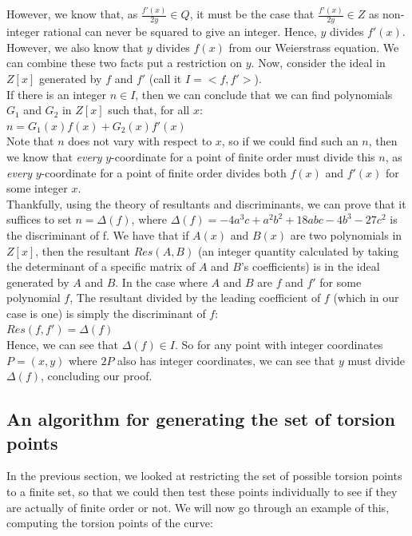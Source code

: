 \documentclass{article}
\begin{document}
However, we know that, as $\frac{f'(x)}{2y} \in Q$, it must be the case that $\frac{f'(x)}{2y} \in Z$ as non-integer rational can never be squared to give an integer. Hence, $y$ divides $f'(x)$. However, we also know that $y$ divides $f(x)$ from our Weierstrass equation. We can combine these two facts put a restriction on $y$. Now, consider the ideal in $Z[x]$ generated by $f$ and $f'$ (call it $I = <f, f'>$).\\

If there is an integer $n \in I$, then we can conclude that we can find polynomials $G_1$ and $G_2$ in $Z[x]$ such that, for all $x$:\\

$n = G_1(x)f(x) + G_2(x)f'(x)$\\

Note that $n$ does not vary with respect to $x$, so if we could find such an $n$, then we know that \emph{every} $y$-coordinate for a point of finite order must divide this $n$, as \emph{every} $y$-coordinate for a point of finite order divides both $f(x)$ and $f'(x)$ for some integer $x$.\\

Thankfully, using the theory of resultants and discriminants, we can prove that it suffices to set $n = \Delta(f)$, where $\Delta(f) = -4a^3c + a^2b^2 + 18abc - 4b^3 - 27c^2$ is the discriminant of f. We have that if $A(x)$ and $B(x)$ are two polynomials in $Z[x]$, then the resultant $Res(A, B)$ (an integer quantity calculated by taking the determinant of a specific matrix of $A$ and $B$'s coefficients) is in the ideal generated by $A$ and $B$. In the case where $A$ and $B$ are $f$ and $f'$ for some polynomial $f$, The resultant divided by the leading coefficient of $f$ (which in our case is one) is simply the discriminant of $f$: \\

$Res(f, f') = \Delta(f)$\\

Hence, we can see that $\Delta(f) \in I$. So for any point with integer coordinates $P = (x, y)$ where $2P$ also has integer coordinates, we can see that $y$ must divide $\Delta(f)$, concluding our proof.


\subsection{An algorithm for generating the set of torsion points}

In the previous section, we looked at restricting the set of possible torsion points to a finite set, so that we could then test these points individually to see if they are actually of finite order or not. We will now go through an example of this, computing the torsion points of the curve:
\end{document}
